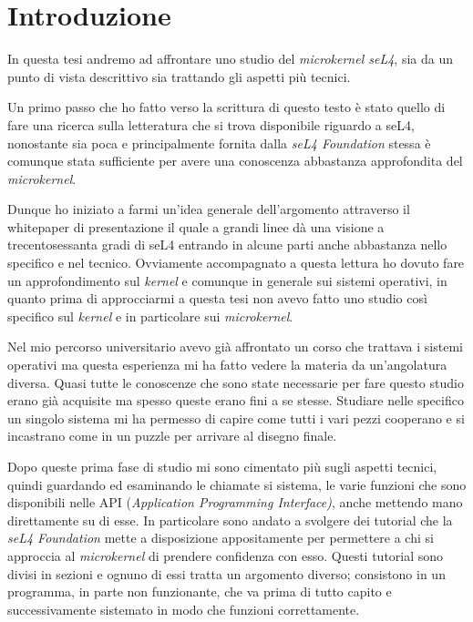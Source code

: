 \chapter{Introduzione}
In questa tesi andremo ad affrontare uno studio del \textit{microkernel seL4}, sia da un punto di vista descrittivo sia trattando gli aspetti più tecnici.

Un primo passo che ho fatto verso la scrittura di questo testo è stato quello di fare una ricerca sulla letteratura che si trova disponibile riguardo a seL4, nonostante sia poca e principalmente fornita dalla \textit{seL4 Foundation} stessa è comunque stata sufficiente per avere una conoscenza abbastanza approfondita del \textit{microkernel}.

Dunque ho iniziato a farmi un'idea generale dell'argomento attraverso il whitepaper \cite{sel4-whitepaper} di presentazione il quale a grandi linee dà una visione a trecentosessanta gradi di seL4 entrando in alcune parti anche abbastanza nello specifico e nel tecnico. Ovviamente accompagnato a questa lettura ho dovuto fare un approfondimento sul \textit{kernel} e comunque in generale sui sistemi operativi, in quanto prima di approcciarmi a questa tesi non avevo fatto uno studio così specifico sul \textit{kernel} e in particolare sui \textit{microkernel}.

Nel mio percorso universitario avevo già affrontato un corso che trattava i sistemi operativi ma questa esperienza mi ha fatto vedere la materia da un'angolatura diversa. Quasi tutte le conoscenze che sono state necessarie per fare questo studio erano già acquisite ma spesso queste erano fini a se stesse. Studiare nelle specifico un singolo sistema mi ha permesso di capire come tutti i vari pezzi cooperano e si incastrano come in un puzzle per arrivare al disegno finale.

Dopo queste prima fase di studio mi sono cimentato più sugli aspetti tecnici, quindi guardando ed esaminando le chiamate si sistema, le varie funzioni che sono disponibili nelle API (\textit{Application Programming Interface)}, anche mettendo mano direttamente su di esse. In particolare sono andato a svolgere dei tutorial che la \textit{seL4 Foundation} mette a disposizione appositamente per permettere a chi si approccia al \textit{microkernel} di prendere confidenza con esso. Questi tutorial sono divisi in sezioni e ognuno di essi tratta un argomento diverso; consistono in un programma, in parte non funzionante, che va prima di tutto capito e successivamente sistemato in modo che funzioni correttamente.

